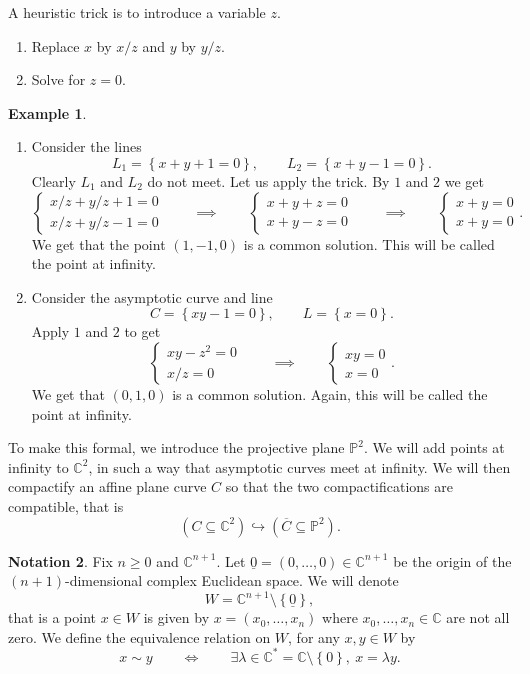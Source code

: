 \documentclass{article}
\newcommand{\C}{\mathbb{C}}
\renewcommand{\P}{\mathbb{P}}
\newcommand{\rb}[1]{\left( #1 \right)}
\newcommand{\cb}[1]{\left\{ #1 \right\}}
\theoremstyle{definition}\newtheorem{definition}{Definition}[section]
\theoremstyle{definition}\newtheorem{notation}[definition]{Notation}
\theoremstyle{definition}\newtheorem{remark}[definition]{Remark}
\theoremstyle{definition}\newtheorem{example}[definition]{Example}
\theoremstyle{definition}\newtheorem{fact}{Fact}
\theoremstyle{definition}\newtheorem{exercise}{Exercise}
\begin{document}
A heuristic trick is to introduce a variable $ z $.
\begin{enumerate}
\item Replace $ x $ by $ x / z $ and $ y $ by $ y / z $.
\item Solve for $ z = 0 $.
\end{enumerate}

\begin{example}
\hfill
\begin{enumerate}
\item Consider the lines
$$ L_1 = \cb{x + y + 1 = 0}, \qquad L_2 = \cb{x + y - 1 = 0}. $$
Clearly $ L_1 $ and $ L_2 $ do not meet. Let us apply the trick. By $ 1 $ and $ 2 $ we get
$$ \begin{cases} x / z + y / z + 1 = 0 \\ x / z + y / z - 1 = 0 \end{cases} \qquad \implies \qquad \begin{cases} x + y + z = 0 \\ x + y - z = 0 \end{cases} \qquad \implies \qquad \begin{cases} x + y = 0 \\ x + y = 0 \end{cases}. $$
We get that the point $ \rb{1, -1, 0} $ is a common solution. This will be called the point at infinity.
\item Consider the asymptotic curve and line
$$ C = \cb{xy - 1 = 0}, \qquad L = \cb{x = 0}. $$
Apply $ 1 $ and $ 2 $ to get
$$ \begin{cases} xy - z^2 = 0 \\ x / z = 0 \end{cases} \qquad \implies \qquad \begin{cases} xy = 0 \\ x = 0 \end{cases}. $$
We get that $ \rb{0, 1, 0} $ is a common solution. Again, this will be called the point at infinity.
\end{enumerate}
\end{example}

To make this formal, we introduce the projective plane $ \P^2 $. We will add points at infinity to $ \C^2 $, in such a way that asymptotic curves meet at infinity. We will then compactify an affine plane curve $ C $ so that the two compactifications are compatible, that is
$$ \rb{C \subseteq \C^2} \hookrightarrow \rb{\overline{C} \subseteq \P^2}. $$

\begin{notation}
Fix $ n \ge 0 $ and $ \C^{n + 1} $. Let $ \underline{0} = \rb{0, \dots, 0} \in \C^{n + 1} $ be the origin of the $ \rb{n + 1} $-dimensional complex Euclidean space. We will denote
$$ W = \C^{n + 1} \setminus \cb{\underline{0}}, $$
that is a point $ x \in W $ is given by $ x = \rb{x_0, \dots, x_n} $ where $ x_0, \dots, x_n \in \C $ are not all zero. We define the equivalence relation on $ W $, for any $ x, y \in W $ by
$$ x \sim y \qquad \iff \qquad \exists \lambda \in \C^* = \C \setminus \cb{0}, \ x = \lambda y. $$
\end{notation}
\end{document}
